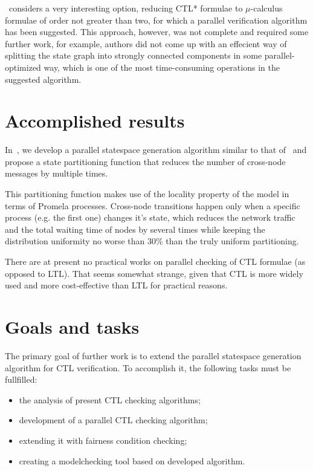 \documentclass[a4paper,notitlepage,14pt]{article}
\begin{document}
\cite{Leucker_parallelmodel}~considers a very interesting option, reducing CTL* formulae to $\mu$-calculus formulae
of order not greater than two, for which a parallel verification algorithm has been
suggested. This approach, however, was not complete and required some further work, for
example, authors did not come up with an effecient way of splitting the state graph into
strongly connected components in some parallel-optimized way, which is one of the most
time-consuming operations in the suggested algorithm.

\section{Accomplished results}
\label{sec:accomplished-results}

In~\cite{Korotkov10MiemEng}, we develop a parallel statespace generation algorithm similar to that of~\cite{LS99} and
propose a state partitioning function that reduces the number of cross-node messages by
multiple times.

This partitioning function makes use of the locality property of the model in terms of
Promela processes. Cross-node transitions happen only when a specific process (e.g. the
first one) changes it's state, which reduces the network traffic and the total waiting
time of nodes by several times while keeping the distribution uniformity no worse than
30\% than the truly uniform partitioning.

There are at present no practical works on parallel checking of CTL formulae (as opposed
to LTL). That seems somewhat strange, given that CTL is more widely used and more
cost-effective than LTL for practical reasons.

\section{Goals and tasks}
\label{sec:goals-tasks}

The primary goal of further work is to extend the parallel statespace
generation algorithm for CTL verification. To accomplish it, the following tasks must be
fullfilled:

\begin{itemize}
\item 
  the analysis of present CTL checking algorithms;
\item development of a parallel CTL checking algorithm;
\item extending it with fairness condition checking;
\item creating a modelchecking tool based on developed algorithm.
\end{itemize}
\end{document}
